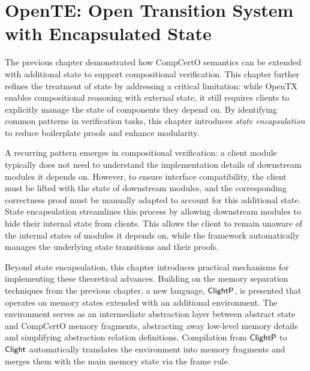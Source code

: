 \chapter{OpenTE: Open Transition System with Encapsulated State}
\label{ch:oe}

The previous chapter demonstrated how CompCertO semantics
can be extended with additional state
to support compositional verification.
This chapter further refines the treatment of state
by addressing a critical limitation:
while OpenTX enables compositional reasoning with external state,
it still requires clients to explicitly manage
the state of components they depend on.
By identifying common patterns in verification tasks,
this chapter introduces \emph{state encapsulation}
to reduce boilerplate proofs and enhance modularity.

A recurring pattern emerges in compositional verification:
a client module typically does not need
to understand the implementation details
of downstream modules it depends on.
However,
to ensure interface compatibility,
the client must be lifted with the state of downstream modules,
and the corresponding correctness proof
must be manually adapted
to account for this additional state.
State encapsulation streamlines this process
by allowing downstream modules
to hide their internal state from clients.
This allows the client to remain unaware of
the internal states of modules it depends on,
while the framework automatically manages
the underlying state transitions and their proofs.

Beyond state encapsulation,
this chapter introduces practical mechanisms
for implementing these theoretical advances.
Building on the memory separation techniques from the previous chapter,
a new language, $ \mathsf{ClightP} $, is presented
that operates on memory states extended with an additional environment.
The environment serves as an intermediate abstraction layer
between abstract state and CompCertO memory fragments,
abstracting away low-level memory details
and simplifying abstraction relation definitions.
Compilation from $ \mathsf{ClightP} $ to $ \mathsf{Clight} $ automatically translates
the environment into memory fragments
and merges them with the main memory state via the frame rule.

